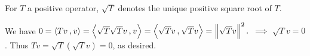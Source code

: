 \begin{mydef}
  For $T$ a positive operator, $\sqrt{T}$ denotes the unique positive square root of $T$.
\end{mydef}

\begin{prf}
  We have $0 = \ip{Tv}{v}= \ip{\sqrt{T}\sqrt{T}v}{v} = \ip{\sqrt{T}v}{\sqrt{T}v} = \norm{\sqrt{T}v}^2.$ $\implies$ $\sqrt{T}v = 0$. Thus $Tv = \sqrt{T}\left(\sqrt{T}v\right)=0$, as desired.
\end{prf}